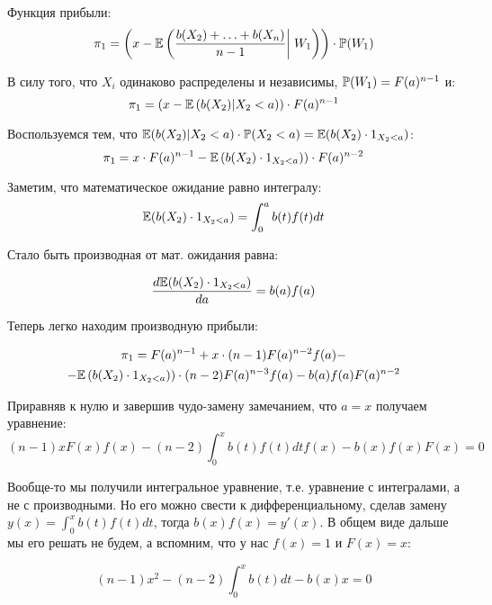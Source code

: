 \begin{enumerate}
Функция прибыли:
\begin{equation}
\pi_{1}=\left(x-\E\left(\frac{b(X_{2})+\ldots+b(X_{n})}{n-1} \right|\left.\vphantom{\frac{b(X_{2})+\ldots+b(X_{n})}{n-1}} W_{1}\right)\right)\cdot \P(W_{1})
\end{equation}

В силу того, что $ X_{i} $ одинаково распределены и независимы, $ \P(W_{1})=F(a)^{n-1} $ и:
\begin{equation}
\pi_{1}=(x-\E\left(b(X_{2})|X_{2}<a)\right)\cdot F(a)^{n-1}
\end{equation}

Воспользуемся тем, что $ \E(b(X_{2})|X_{2}<a)\cdot \P(X_{2}<a)=\E(b(X_{2})\cdot 1_{X_{2}<a}) $:
\begin{equation}
\pi_{1}=x\cdot F(a)^{n-1}-\E\left(b(X_{2})\cdot 1_{X_{2}<a})\right)\cdot F(a)^{n-2}
\end{equation}

Заметим, что математическое ожидание равно интегралу: 
\begin{equation}
\E(b(X_{2})\cdot 1_{X_{2}<a})=\int_{0}^{a}b(t)f(t)dt
\end{equation}

Стало быть производная от мат. ожидания равна:

\begin{equation}
\frac{d \E(b(X_{2})\cdot 1_{X_{2}<a})}{d a}=b(a)f(a)
\end{equation}

Теперь легко находим производную прибыли:

\begin{multline}
\pi_{1}=F(a)^{n-1}+x\cdot (n-1) F(a)^{n-2}f(a)-\\
-\E\left(b(X_{2})\cdot 1_{X_{2}<a})\right)\cdot (n-2)F(a)^{n-3}f(a)-b(a)f(a)F(a)^{n-2}
\end{multline}

Приравняв к нулю и завершив чудо-замену замечанием, что $ a=x $ получаем уравнение:
\begin{equation}
(n-1)xF(x)f(x)-(n-2)\int_{0}^{x}b(t)f(t)dt f(x)-b(x)f(x)F(x)=0
\end{equation}

Вообще-то мы получили интегральное уравнение, т.е. уравнение с интегралами, а не с производными. Но его можно свести к дифференциальному, сделав замену $ y(x)=\int_{0}^{x}b(t)f(t)dt $, тогда $ b(x)f(x)=y'(x) $. В общем виде дальше мы его решать не будем, а вспомним, что у нас $ f(x)=1 $ и $ F(x)=x $:

\begin{equation}
(n-1)x^{2}-(n-2)\int_{0}^{x}b(t)dt -b(x)x=0
\end{equation}


\end{enumerate}
